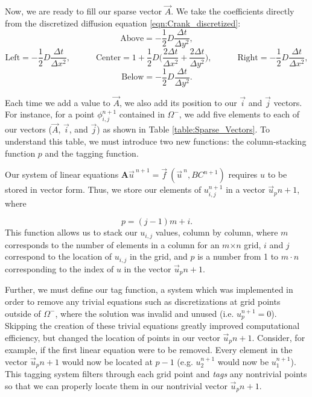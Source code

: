 \documentclass[oneside,12pt,final]{/Applications/TeX/packages/ucthesis-CA2012}
\begin{document}
\begin{mainmatter}
\clearpage
Now, we are ready to fill our sparse vector $\vec{A}$. We take the coefficients directly from the discretized diffusion equation \eqref{eqn:Crank_discretized}:
\dhalfsp
\begin{equation*}
\text{Above} =-\frac{1}{2}D\frac{\Delta t}{\Delta y^2},
\end{equation*}
\begin{equation*}
\text{Left}  =-\frac{1}{2}D\frac{\Delta t}{\Delta x^2}, \quad \quad \quad \text{Center} = 1 + \frac{1}{2}D\bigg(\frac{2 \Delta t}{\Delta x^2} + \frac{2 \Delta t}{\Delta y^2}\bigg), \quad \quad  \quad \text{Right} =-\frac{1}{2}D\frac{\Delta t}{\Delta x^2},
\end{equation*}
\begin{equation}\label{eqn:Crank_coeffs}
\text{Below} =-\frac{1}{2}D\frac{\Delta t}{\Delta y^2}.
\end{equation}

\dsp
Each time we add a value to $\vec{A}$, we also add its position to our $\vec{i}$ and $\vec{j}$ vectors. For instance, for a point $\phi_{i,j}^{n+1}$ contained in $\Omega^-$, we add five elements to each of our vectors ($\vec{A}$, $\vec{i}$, and $\vec{j}$) as shown in Table \ref{table:Sparse_Vectors}. To understand this table, we must introduce two new functions: the column-stacking function $p$ and the tagging function.

Our system of linear equations $\boldsymbol{A}\vec{u}^{\>n+1} = \vec{f}\>(\vec{u}^{\>n},BC^{n+1})$ requires $u$ to be stored in vector form. Thus, we store our elements of $u_{i,j}^{n+1}$ in a vector $\vec{u}_p^ \> {n+1}$, where

\begin{equation}
p  = (j-1)m+i.
\end{equation}
This function allows us to stack our $u_{i,j}$ values, column by column, where $m$ corresponds to the number of elements in a column for an $m$$\times$$n$ grid, $i$ and $j$ correspond to the location of $u_{i,j}$ in the grid, and $p$ is a number from 1 to $m\cdot n$ corresponding to the index of $u$ in the vector $\vec{u}_p^ \> {n+1}$.

Further, we must define our tag function, a system which was implemented in order to remove any trivial equations such as discretizations at grid points outside of $\Omega^-$, where the solution was invalid and unused (i.e. $u^{n+1}_{p} = 0$). Skipping the creation of these trivial equations greatly improved computational efficiency, but changed the location of points in our vector $\vec{u}_p^ \> {n+1}$. Consider, for example, if the first linear equation were to be removed. Every element in the vector $\vec{u}_p^ \> {n+1}$ would now be located at $p-1$ (e.g. $u_{2}^{n+1}$ would now be $u_{1}^{n+1}$). This tagging system filters through each grid point and \textit{tags} any nontrivial points so that we can properly locate them in our nontrivial vector $\vec{u}_p^ \> {n+1}$.


\end{mainmatter}
\end{document}
